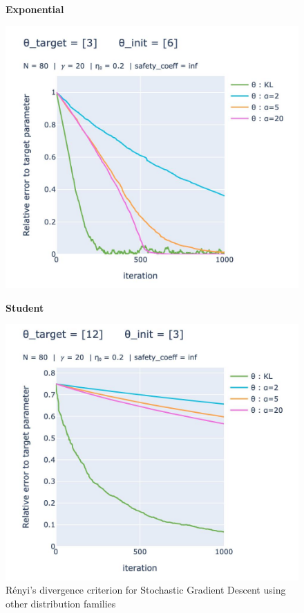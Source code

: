 \begin{figure}[H]
    \centering
    \label{sim:renyi-other-distrib}
    \begin{minipage}{0.5\textwidth}
    \centering
    \textbf{Exponential}
    
    \includegraphics[width = \linewidth]{Images/simulation/exponential_renyi.jpeg}
    \end{minipage}
    \begin{minipage}{0.48\textwidth}
    \centering
    \textbf{Student}
    
    \includegraphics[width = \linewidth]{Images/simulation/student_renyi.jpeg}
    
    \end{minipage}
    \caption{Rényi's divergence criterion for Stochastic Gradient Descent using other distribution families}
\end{figure}

